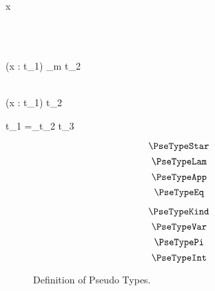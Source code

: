 
\Rule{\PseTypeStar}
    {\color{white}{\_}}
    {\star\psetype}
    {}

\Rule{\PseTypeKind}
    {\color{white}{\_}}
    {\kind\psetype}
    {}

\Rule{\PseTypeVar}
    {\color{white}{\_}}
    {x\psetype}
    {}

\Rule{\PseTypeLam}
    {
         \\
    }
    {\psetype}
    {}

\Rule{\PseTypeApp}
    {
    }
    {\psetype}
    {}

\Rule{\PseTypePi}
    {
         \\
    }
    {(x : t_1) \to_m t_2\psetype}
    {}

\Rule{\PseTypeInt}
    {
         \\
    }
    {(x : t_1) \cap t_2\psetype}
    {}

\Rule{\PseTypeEq}
    {
    }
    {t_1 =_{t_2} t_3\psetype}
    {}

\begin{figure}
    \centering
    \begin{minipage}{0.5\textwidth}
        $$\PseTypeStar$$
        $$\PseTypeLam$$
        $$\PseTypeApp$$
        $$\PseTypeEq$$
    \end{minipage}%
    \begin{minipage}{0.5\textwidth}
        $$\PseTypeKind$$
        $$\PseTypeVar$$
        $$\PseTypePi$$
        $$\PseTypeInt$$
    \end{minipage}%
    \caption{Definition of Pseudo Types.}
\end{figure}